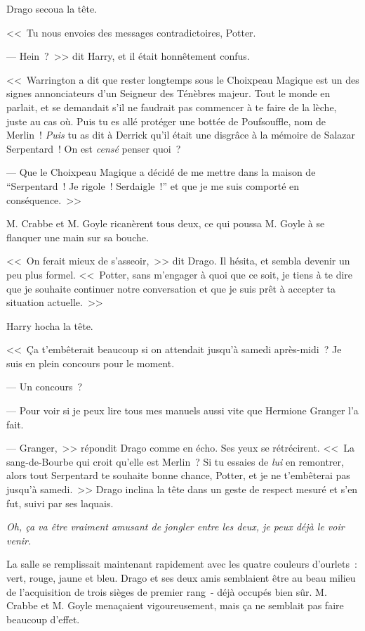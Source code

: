 Drago secoua la tête.

<<~Tu nous envoies des messages contradictoires, Potter.

--- Hein~?~>> dit Harry, et il était honnêtement confus.

<<~Warrington a dit que rester longtemps sous le Choixpeau Magique est un des signes annonciateurs d'un Seigneur des Ténèbres majeur. Tout le monde en parlait, et se demandait s'il ne faudrait pas commencer à te faire de la lèche, juste au cas où. Puis tu es allé protéger une bottée de Poufsouffle, nom de Merlin~! \emph{Puis} tu as dit à Derrick qu'il était une disgrâce à la mémoire de Salazar Serpentard~! On est \emph{censé} penser quoi~?

--- Que le Choixpeau Magique a décidé de me mettre dans la maison de “Serpentard~! Je rigole~! Serdaigle~!” et que je me suis comporté en conséquence.~>>

M. Crabbe et M. Goyle ricanèrent tous deux, ce qui poussa M. Goyle à se flanquer une main sur sa bouche.

<<~On ferait mieux de s'asseoir,~>> dit Drago. Il hésita, et sembla devenir un peu plus formel. <<~Potter, sans m'engager à quoi que ce soit, je tiens à te dire que je souhaite continuer notre conversation et que je suis prêt à accepter ta situation actuelle.~>>

Harry hocha la tête.

<<~Ça t'embêterait beaucoup si on attendait jusqu'à samedi après-midi~? Je suis en plein concours pour le moment.

--- Un concours~?

--- Pour voir si je peux lire tous mes manuels aussi vite que Hermione Granger l'a fait.

--- Granger,~>> répondit Drago comme en écho. Ses yeux se rétrécirent. <<~La sang-de-Bourbe qui croit qu'elle est Merlin~? Si tu essaies de \emph{lui} en remontrer, alors tout Serpentard te souhaite bonne chance, Potter, et je ne t'embêterai pas jusqu'à samedi.~>> Drago inclina la tête dans un geste de respect mesuré et s'en fut, suivi par ses laquais.

\emph{Oh, ça va être vraiment amusant de jongler entre les deux, je peux déjà le voir venir.}

La salle se remplissait maintenant rapidement avec les quatre couleurs d'ourlets~: vert, rouge, jaune et bleu. Drago et ses deux amis semblaient être au beau milieu de l'acquisition de trois sièges de premier rang~- déjà occupés bien sûr. M. Crabbe et M. Goyle menaçaient vigoureusement, mais ça ne semblait pas faire beaucoup d'effet.

